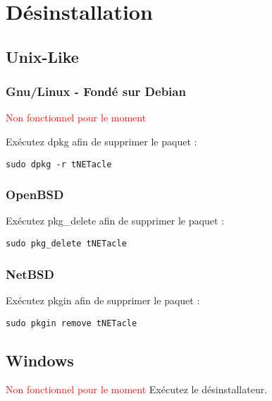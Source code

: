 \section{Désinstallation}
\subsection{Unix-Like}
\subsubsection{Gnu/Linux - Fondé sur Debian}
\textcolor{red}{Non fonctionnel pour le moment}

Exécutez dpkg afin de supprimer le paquet :

\begin{lstlisting}
sudo dpkg -r tNETacle
\end{lstlisting}

\subsubsection{OpenBSD}

Exécutez pkg\_delete afin de supprimer le paquet :

\begin{lstlisting}
sudo pkg_delete tNETacle
\end{lstlisting}

\subsubsection{NetBSD}

Exécutez pkgin afin de supprimer le paquet :

\begin{lstlisting}
sudo pkgin remove tNETacle
\end{lstlisting}

\subsection{Windows}
\textcolor{red}{Non fonctionnel pour le moment}
Exécutez le désinstallateur.
